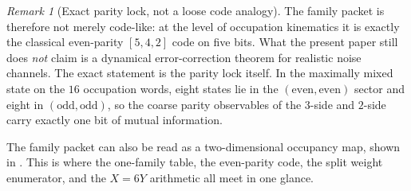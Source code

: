 \documentclass[11pt,a4paper]{article}
\theoremstyle{definition}
\theoremstyle{remark}
\newtheorem*{remark}{Remark}
\begin{document}
\begin{remark}[Exact parity lock, not a loose code analogy]
The family packet is therefore not merely code-like: at the level of occupation kinematics it is exactly the classical even-parity $[5,4,2]$ code on five bits. What the present paper still does \emph{not} claim is a dynamical error-correction theorem for realistic noise channels. The exact statement is the parity lock itself. In the maximally mixed state on the $16$ occupation words, eight states lie in the $(\mathrm{even},\mathrm{even})$ sector and eight in $(\mathrm{odd},\mathrm{odd})$, so the coarse parity observables of the $3$-side and $2$-side carry exactly one bit of mutual information.
\end{remark}

The family packet can also be read as a two-dimensional occupancy map, shown in . This is where the one-family table, the even-parity code, the split weight enumerator, and the $X=6Y$ arithmetic all meet in one glance.
\end{document}
